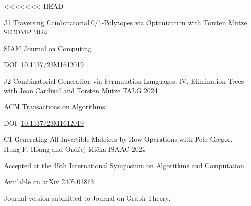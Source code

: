 
<<<<<<< HEAD



\vspace{2 mm}
\vspace{2 mm}

\begin{cvpublications}

  \cvpublication
  {J1}
  {Traversing Combinatorial 0/1-Polytopes via Optimization} %
  {with Torsten Mütze} %
  {SICOMP} %
  {2024}
  {
  \begin{cvitems} %
    \item SIAM Journal on Computing.
    \item[] DOI: \href{https://doi.org/10.1137/23M1612019}{10.1137/23M1612019}
  \end{cvitems}
  }

  \vspace{2 mm}

  \cvpublication
  {J2}
  {Combinatorial Generation via Permutation Languages. IV.  Elimination Trees} %
  {with Jean Cardinal and Torsten Mütze} %
  {TALG} %
  {2024}
  {
  \begin{cvitems} %
    \item ACM Transactions on Algorithms.
    \item[] DOI: \href{https://doi.org/10.1137/23M1612019}{10.1137/23M1612019}
  \end{cvitems}
  }
\end{cvpublications}

  
\vspace{10mm}
\vspace{2mm}

\begin{cvpublications}
  \cvpublication
  {C1} %
  {Generating All Invertible Matrices by Row Operations} %
  {with Petr Gregor, Hung P. Hoang and Ondřej Mička} %
  {ISAAC} %
  {2024}
  {
  \begin{cvitems} %
    \item Accepted at the 35th International Symposium on Algorithms and Computation.
    \item[] Available on \href{https://arxiv.org/abs/2405.01863}{arXiv 2405.01863}.
    \item Journal version submitted to Journal on Graph Theory.
  \end{cvitems}
  }
\end{cvpublications}
  
